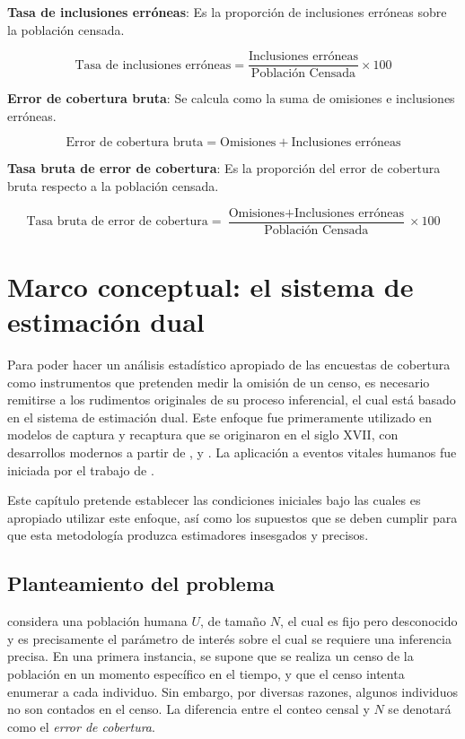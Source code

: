 \documentclass[
  12pt,
]{book}
\begin{document}
\textbf{Tasa de inclusiones erróneas}: Es la proporción de inclusiones erróneas sobre la población censada.

\[
\text{Tasa de inclusiones erróneas} = \frac{\text{Inclusiones erróneas}}{\text{Población Censada}} \times 100
\]

\textbf{Error de cobertura bruta}: Se calcula como la suma de omisiones e inclusiones erróneas.

\[
\text{Error de cobertura bruta} = \text{Omisiones} + \text{Inclusiones erróneas}
\]

\textbf{Tasa bruta de error de cobertura}: Es la proporción del error de cobertura bruta respecto a la población censada.

\[
\text{Tasa bruta de error de cobertura} = \frac{\text{Omisiones} + \text{Inclusiones erróneas}}{\text{Población Censada}} \times 100
\]

\chapter{Marco conceptual: el sistema de estimación dual}\label{cap2}

Para poder hacer un análisis estadístico apropiado de las encuestas de cobertura como instrumentos que pretenden medir la omisión de un censo, es necesario remitirse a los rudimentos originales de su proceso inferencial, el cual está basado en el sistema de estimación dual. Este enfoque fue primeramente utilizado en modelos de captura y recaptura que se originaron en el siglo XVII, con desarrollos modernos a partir de \citet{petersen1896}, \citet{lincoln1930} y \citet{schnabel1938}. La aplicación a eventos vitales humanos fue iniciada por el trabajo de \citet{sekar1949}.

Este capítulo pretende establecer las condiciones iniciales bajo las cuales es apropiado utilizar este enfoque, así como los supuestos que se deben cumplir para que esta metodología produzca estimadores insesgados y precisos.

\section{Planteamiento del problema}\label{planteamiento-del-problema}

\citet{wolter1986coverage} considera una población humana \(U\), de tamaño \(N\), el cual es fijo pero desconocido y es precisamente el parámetro de interés sobre el cual se requiere una inferencia precisa. En una primera instancia, se supone que se realiza un censo de la población en un momento específico en el tiempo, y que el censo intenta enumerar a cada individuo. Sin embargo, por diversas razones, algunos individuos no son contados en el censo. La diferencia entre el conteo censal y \(N\) se denotará como el \emph{error de cobertura}.
\end{document}
